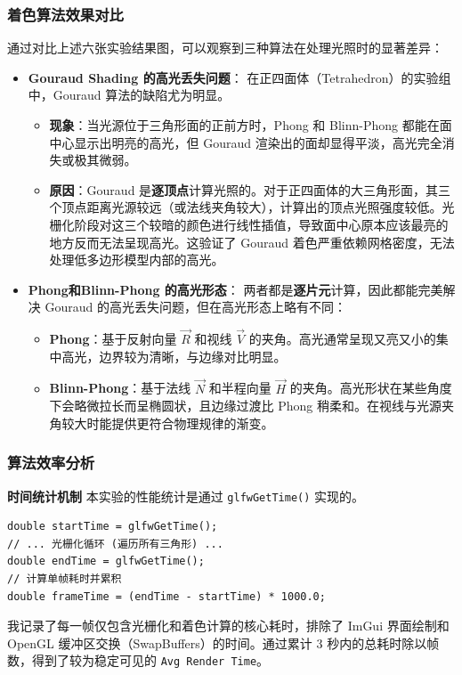 \documentclass[a4paper]{article}
\begin{document}
\subsubsection{着色算法效果对比}
通过对比上述六张实验结果图，可以观察到三种算法在处理光照时的显著差异：

\begin{itemize}
    \item \textbf{Gouraud Shading 的高光丢失问题}：
    在正四面体（Tetrahedron）的实验组中，Gouraud 算法的缺陷尤为明显。
    \begin{itemize}
        \item \textbf{现象}：当光源位于三角形面的正前方时，Phong 和 Blinn-Phong 都能在面中心显示出明亮的高光，但 Gouraud 渲染出的面却显得平淡，高光完全消失或极其微弱。
        \item \textbf{原因}：Gouraud 是\textbf{逐顶点}计算光照的。对于正四面体的大三角形面，其三个顶点距离光源较远（或法线夹角较大），计算出的顶点光照强度较低。光栅化阶段对这三个较暗的颜色进行线性插值，导致面中心原本应该最亮的地方反而无法呈现高光。这验证了 Gouraud 着色严重依赖网格密度，无法处理低多边形模型内部的高光。
    \end{itemize}

    \item \textbf{Phong和Blinn-Phong 的高光形态}：
    两者都是\textbf{逐片元}计算，因此都能完美解决 Gouraud 的高光丢失问题，但在高光形态上略有不同：
    \begin{itemize}
        \item \textbf{Phong}：基于反射向量 $\vec{R}$ 和视线 $\vec{V}$ 的夹角。高光通常呈现又亮又小的集中高光，边界较为清晰，与边缘对比明显。
        \item \textbf{Blinn-Phong}：基于法线 $\vec{N}$ 和半程向量 $\vec{H}$ 的夹角。高光形状在某些角度下会略微拉长而呈椭圆状，且边缘过渡比 Phong 稍柔和。在视线与光源夹角较大时能提供更符合物理规律的渐变。
    \end{itemize}
\end{itemize}

\subsubsection{算法效率分析}

\textbf{时间统计机制}
本实验的性能统计是通过 \texttt{glfwGetTime()} 实现的。
\begin{lstlisting}
double startTime = glfwGetTime();
// ... 光栅化循环 (遍历所有三角形) ...
double endTime = glfwGetTime();
// 计算单帧耗时并累积
double frameTime = (endTime - startTime) * 1000.0;
\end{lstlisting}
我记录了每一帧仅包含光栅化和着色计算的核心耗时，排除了 ImGui 界面绘制和 OpenGL 缓冲区交换（SwapBuffers）的时间。通过累计 3 秒内的总耗时除以帧数，得到了较为稳定可见的 \texttt{Avg Render Time}。
\end{document}
